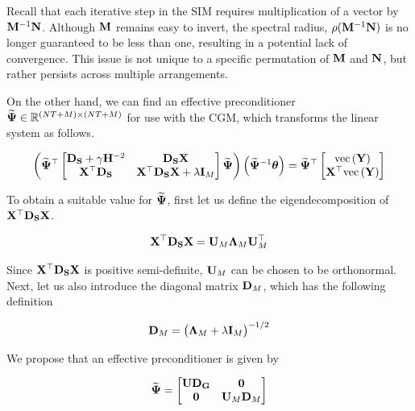 Recall that each iterative step in the SIM requires multiplication of a vector by $\mathbf{M}^{-1}\mathbf{N}$. Although $\mathbf{M}$ remains easy to invert, the spectral radius, $\rho(\mathbf{M}^{-1}\mathbf{N})$ is no longer guaranteed to be less than one, resulting in a potential lack of convergence. This issue is not unique to a specific permutation of $\mathbf{M}$ and $\mathbf{N}$, but rather persists across multiple arrangements. 

On the other hand, we can find an effective preconditioner $\widetilde{\mathbf{\Psi}}  \in \mathbb{R}^{(NT + M) \times (NT + M)}$ for use with the CGM, which transforms the linear system as follows. 

\begin{equation}
    \left( \widetilde{\mathbf{\Psi}}^\top \begin{bmatrix}
        \mathbf{D}_{\mathbf{S}} + \gamma \mathbf{H}^{-2} & \mathbf{D}_{\mathbf{S}}  \mathbf{X} \\
        \mathbf{X}^\top \mathbf{D}_{\mathbf{S}} & \mathbf{X}^\top \mathbf{D}_{\mathbf{S}} \mathbf{X} + \lambda \mathbf{I}_M   
       \end{bmatrix}  \widetilde{\mathbf{\Psi}} \right) \left( \widetilde{\mathbf{\Psi}}^{-1} \boldsymbol{\theta} \right)   = \widetilde{\mathbf{\Psi}}^\top \begin{bmatrix} \text{\textup{vec}}\left(\mathbf{Y}\right) \\ \mathbf{X}^\top \text{\textup{vec}}\left(\mathbf{Y}\right) \end{bmatrix}
\end{equation}


To obtain a suitable value for $\widetilde{\mathbf{\Psi}}$, first let us define the eigendecomposition of $\mathbf{X}^\top\mathbf{D}_{\mathbf{S}} \mathbf{X}$. 

\begin{equation}
    \mathbf{X}^\top\mathbf{D}_{\mathbf{S}} \mathbf{X} = \mathbf{U}_M \mathbf{\Lambda}_M \mathbf{U}_M^\top
\end{equation}

Since $\mathbf{X}^\top\mathbf{D}_{\mathbf{S}} \mathbf{X}$ is positive semi-definite, $\mathbf{U}_M$ can be chosen to be orthonormal. Next, let us also introduce the diagonal matrix $\mathbf{D}_M$, which has the following definition 

\begin{equation}
    \mathbf{D}_M = \big(\mathbf{\Lambda}_M + \lambda \mathbf{I}_M \big)^{-1/2}
\end{equation}

We propose that an effective preconditioner is given by 

\begin{equation}
    \widetilde{\mathbf{\Psi}} =  \begin{bmatrix}
        \mathbf{U} \mathbf{D}_{\mathbf{G}} & \mathbf{0} \\
        \mathbf{0} & \mathbf{U}_M \mathbf{D}_M 
    \end{bmatrix}
\end{equation}


